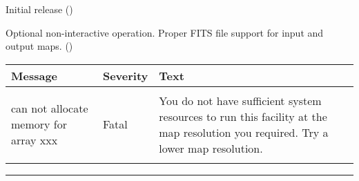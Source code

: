 \begin{release}
  \begin{relist}
    \item Initial release ()
    \item Optional non-interactive operation. Proper FITS file support
    for input and output maps. ()
  \end{relist}
\end{release}
\newpage
\begin{messages}
{
\begin{tabular}{p{0.25\hsize} p{0.1\hsize} p{0.35\hsize}} \hline  
  \textbf{Message} & \textbf{Severity} & \textbf{Text} \\ \hline
                   &                   &   \\ %
can not allocate memory for array xxx &  Fatal & You do not have
                   sufficient system resources to run this
                   facility at the map resolution you required. 
  Try a lower map resolution.  \\ 
                   &                   &   \\ \hline %
\end{tabular}
} 
\end{messages}

\rule{\hsize}{2mm}

\newpage
